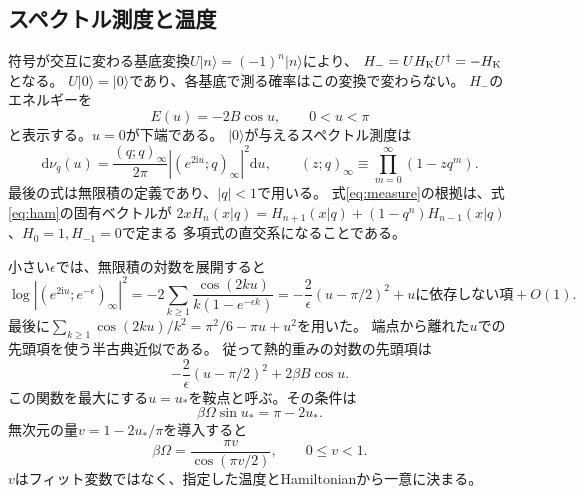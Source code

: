 \documentclass[a4paper,11pt]{ltjsarticle}
\numberwithin{equation}{section}
\newcommand{\ket}[1]{\lvert#1\rangle}
\newcommand{\dd}{\mathrm d}
\newcommand{\ii}{\mathrm i}
\begin{document}
\subsection{スペクトル測度と温度}
符号が交互に変わる基底変換$U\ket n=(-1)^n\ket n$により、
$H_-=UH_{\rm K}U^\dagger=-H_{\rm K}$となる。
$U\ket0=\ket0$であり、各基底で測る確率はこの変換で変わらない。
$H_-$のエネルギーを
\begin{equation}
 E(u)=-2B\cos u,\qquad 0<u<\pi
\end{equation}
と表示する。$u=0$が下端である。
$\ket0$が与えるスペクトル測度は\cite{Heller}
\begin{equation}
 \dd\nu_q(u)=\frac{(q;q)_\infty}{2\pi}
       |(e^{2\ii u};q)_\infty|^2\dd u,\qquad
 (z;q)_\infty\equiv\prod_{m=0}^{\infty}(1-zq^m).
 \label{eq:measure}
\end{equation}
最後の式は無限積の定義であり、$|q|<1$で用いる。
式\eqref{eq:measure}の根拠は、式\eqref{eq:ham}の固有ベクトルが
$2xH_n(x|q)=H_{n+1}(x|q)+(1-q^n)H_{n-1}(x|q)$、$H_0=1,H_{-1}=0$で定まる
多項式の直交系になることである。

小さい$\epsilon$では、無限積の対数を展開すると
\begin{equation}
 \log |(e^{2\ii u};e^{-\epsilon})_\infty|^2
 =-2\sum_{k\geq1}\frac{\cos(2ku)}{k(1-e^{-\epsilon k})}
 =-\frac{2}{\epsilon}(u-\pi/2)^2+\text{$u$に依存しない項}+O(1).
\end{equation}
最後に$\sum_{k\geq1}\cos(2ku)/k^2=\pi^2/6-\pi u+u^2$を用いた。
端点から離れた$u$での先頭項を使う半古典近似である。
従って熱的重みの対数の先頭項は
\begin{equation}
 -\frac{2}{\epsilon}(u-\pi/2)^2+2\beta B\cos u.
\end{equation}
この関数を最大にする$u=u_*$を鞍点と呼ぶ。その条件は
\begin{equation}
 \beta\Omega\sin u_*=\pi-2u_*.
 \label{eq:saddle}
\end{equation}
無次元の量$v=1-2u_*/\pi$を導入すると
\begin{equation}
 \beta\Omega=\frac{\pi v}{\cos(\pi v/2)},\qquad 0\leq v<1.
 \label{eq:v}
\end{equation}
$v$はフィット変数ではなく、指定した温度とHamiltonianから一意に決まる。
\end{document}
